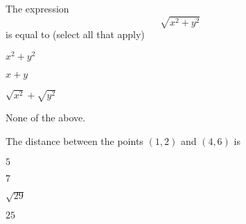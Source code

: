\documentclass[nooutcomes,noauthor]{ximera}
\author{Claire Merriman \and Bart Snapp}
\begin{document}
\maketitle



\begin{exercise}
  The expression
  \[
  \sqrt{x^2+y^2} 
  \]
  is equal to (select all that apply)
  \begin{enumerate}
\begin{multicols}{2}
 \item $x^2+y^2$
 \item $x+y$
 \item $\sqrt{x^2}+\sqrt{y^2}$
 \item None of the above.
\end{multicols}
\end{enumerate}
\end{exercise}




\begin{exercise}
The distance between the points
$(1,2)$ and $(4,6)$ is
\begin{enumerate}
\begin{multicols}{2}
 \item $5$ %
 \item $7$ %
 \item $\sqrt{29}$ 
 \item $25$
\end{multicols}
\end{enumerate}
\end{exercise}
\end{document}
